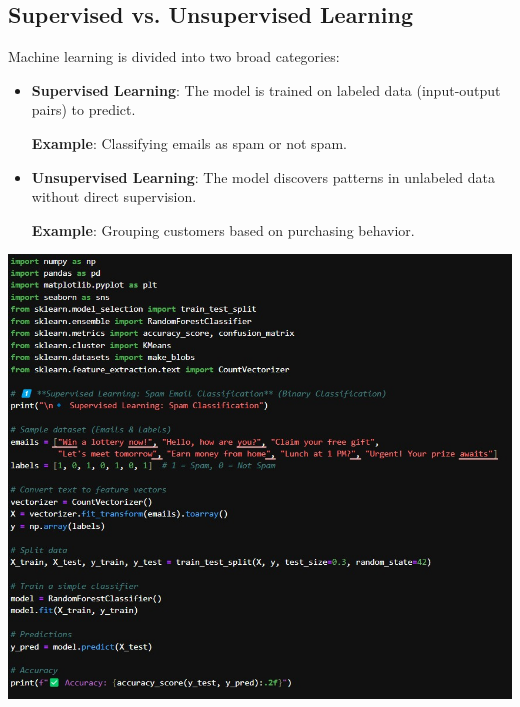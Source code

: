 \documentclass{article}
\begin{document}
\subsection{Supervised vs. Unsupervised Learning}
Machine learning is divided into two broad categories:
\begin{itemize}
    \item \textbf{Supervised Learning}: The model is trained on labeled data (input-output pairs) to predict. 
    
    \textbf{Example}: Classifying emails as spam or not spam.
    \item \textbf{Unsupervised Learning}: The model discovers patterns in unlabeled data without direct supervision.
    
    \textbf{Example}: Grouping customers based on purchasing behavior.
\end{itemize}
\includegraphics[width=16cm,height=14
cm]{Supervised.jpeg}
\end{document}
